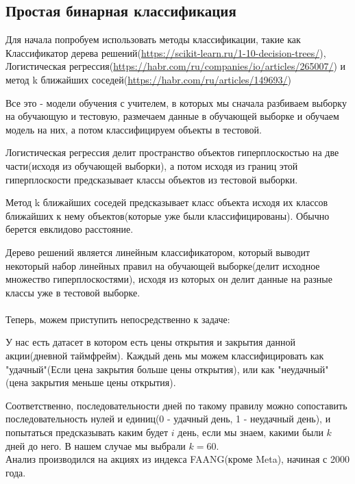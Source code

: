 \documentclass[12pt]{article}
\begin{document}
{\subsection{Простая бинарная классификация}
Для начала попробуем использовать методы классификации, такие как Классификатор дерева решений(\url{https://scikit-learn.ru/1-10-decision-trees/}), Логистическая регрессия(\url{https://habr.com/ru/companies/io/articles/265007/}) и метод k ближайших соседей(\url{https://habr.com/ru/articles/149693/})\\
\par
Все это - модели обучения с учителем, в которых мы сначала разбиваем выборку на обучающую и тестовую, размечаем данные в обучающей выборке и обучаем модель на них, а потом классифицируем объекты в тестовой.\\
\par Логистическая регрессия делит пространство объектов гиперплоскостью на две части(исходя из обучающей выборки), а потом исходя из границ этой гиперплоскости предсказывает классы объектов из тестовой выборки.
\\ \par
Метод k ближайших соседей предсказывает класс объекта исходя их классов ближайших к нему объектов(которые уже были классифицированы). Обычно берется евклидово расстояние.
\\ \par
Дерево решений является линейным классификатором, который выводит некоторый набор линейных правил на обучающей выборке(делит исходное множество гиперплоскостями), исходя из которых он делит данные на разные классы уже в тестовой выборке. 
\\
\\
Теперь, можем приступить непосредственно к задаче:
\\
\par
У нас есть датасет в котором есть цены открытия и закрытия данной акции(дневной таймфрейм). Каждый день мы можем классифицировать как "удачный"(Если цена закрытия больше цены открытия), или как "неудачный"(цена закрытия меньше цены открытия).\\ \par Соответственно, последовательности дней по такому правилу можно сопоставить последовательность нулей и единиц(0 - удачный день, 1 - неудачный день), и попытаться предсказывать каким будет $i$  день, если мы знаем, какими были $k$ дней до него. В нашем случае мы выбрали $k = 60$. \\
Анализ производился на акциях из индекса FAANG(кроме Meta), начиная с 2000 года.\\ \par
}
\end{document}
